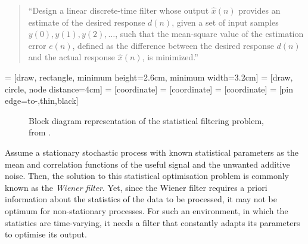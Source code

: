 \begin{quote}``Design a linear discrete-time filter whose output $\hat{x}(n)$ provides an estimate of the desired response $d(n)$, given a set of input samples $y(0), y(1), y(2), \dots$, such that the mean-square value of the estimation error $e(n)$, defined as the difference between the desired response $d(n)$ and the actual response $\hat{x}(n)$, is minimized.''
\end{quote}

 = [draw, rectangle, 
    minimum height=2.6cm, minimum width=3.2cm]
 = [draw, circle, node distance=4cm]
 = [coordinate]
 = [coordinate]
 = [coordinate]
 = [pin edge={to-,thin,black}]

\begin{figure}
\centering
{}
\caption{Block diagram representation of the statistical filtering problem, from \cite{haykin2002adaptive}.} \label{fig:filtering_problem}
\end{figure}

Assume a stationary stochastic process with known statistical parameters as the mean and correlation functions of the useful signal and the unwanted additive noise. Then, the solution to this statistical optimisation problem is commonly known as the \emph{Wiener filter}. Yet, since the Wiener filter requires a priori information about the statistics of the data to be processed, it may not be optimum for non-stationary processes. For such an environment, in which the statistics are time-varying, it needs a filter that constantly adapts its parameters to optimise its output.

